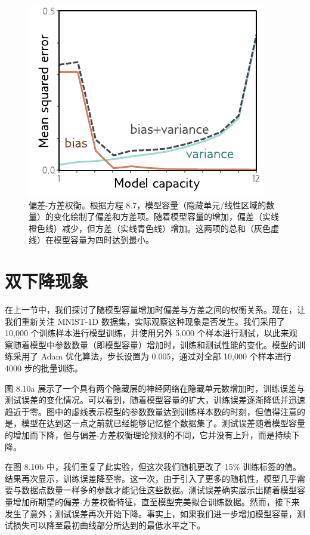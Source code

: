 \documentclass[lang=cn,newtx,10pt,scheme=chinese]{elegantbook}
\begin{document}
\begin{figure}[ht!]
\centering
\includegraphics[width=0.7\linewidth]{PDFFigures/UDLChap8PDF/PerfBiasVarianceTradeoff.pdf}
\caption{偏差-方差权衡。根据方程 8.7，模型容量（隐藏单元/线性区域的数量）的变化绘制了偏差和方差项。随着模型容量的增加，偏差（实线橙色线）减少，但方差（实线青色线）增加。这两项的总和（灰色虚线）在模型容量为四时达到最小。}
\end{figure}

\section{双下降现象}
在上一节中，我们探讨了随模型容量增加时偏差与方差之间的权衡关系。现在，让我们重新关注 MNIST-1D 数据集，实际观察这种现象是否发生。我们采用了 10,000 个训练样本进行模型训练，并使用另外 5,000 个样本进行测试，以此来观察随着模型中参数数量（即模型容量）增加时，训练和测试性能的变化。模型的训练采用了 Adam 优化算法，步长设置为 0.005，通过对全部 10,000 个样本进行 4000 步的批量训练。

图 8.10a 展示了一个具有两个隐藏层的神经网络在隐藏单元数增加时，训练误差与测试误差的变化情况。可以看到，随着模型容量的扩大，训练误差逐渐降低并迅速趋近于零。图中的虚线表示模型的参数数量达到训练样本数的时刻，但值得注意的是，模型在达到这一点之前就已经能够记忆整个数据集了。测试误差随着模型容量的增加而下降，但与偏差-方差权衡理论预测的不同，它并没有上升，而是持续下降。

在图 8.10b 中，我们重复了此实验，但这次我们随机更改了 15\% 训练标签的值。结果再次显示，训练误差降至零。这一次，由于引入了更多的随机性，模型几乎需要与数据点数量一样多的参数才能记住这些数据。测试误差确实展示出随着模型容量增加所期望的偏差-方差权衡特征，直至模型完美拟合训练数据。然而，接下来发生了意外；测试误差再次开始下降。事实上，如果我们进一步增加模型容量，测试损失可以降至最初曲线部分所达到的最低水平之下。
\end{document}
